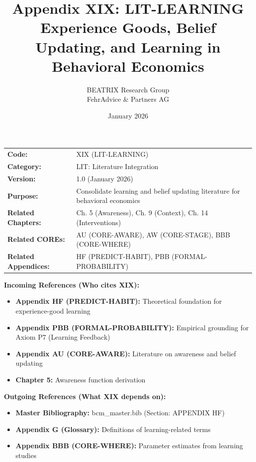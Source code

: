 \documentclass[11pt, a4paper]{article}
\title{Appendix XIX: LIT-LEARNING\\
Experience Goods, Belief Updating, and Learning in Behavioral Economics}
\author{BEATRIX Research Group \\ FehrAdvice \& Partners AG}
\date{January 2026}
\begin{document}
\maketitle


\begin{tcolorbox}[colback=gray!10!white, colframe=gray!75!black, title=Appendix Metadata]
\begin{tabular}{@{}ll@{}}
\textbf{Code:} & XIX (LIT-LEARNING) \\
\textbf{Category:} & LIT: Literature Integration \\
\textbf{Version:} & 1.0 (January 2026) \\
\textbf{Purpose:} & Consolidate learning and belief updating literature for behavioral economics \\
\textbf{Related Chapters:} & Ch. 5 (Awareness), Ch. 9 (Context), Ch. 14 (Interventions) \\
\textbf{Related COREs:} & AU (CORE-AWARE), AW (CORE-STAGE), BBB (CORE-WHERE) \\
\textbf{Related Appendices:} & HF (PREDICT-HABIT), PBB (FORMAL-PROBABILITY) \\
\end{tabular}
\end{tcolorbox}


\begin{tcolorbox}[colback=cyan!5!white, colframe=cyan!75!black, title=Cross-Reference Map]
\textbf{Incoming References (Who cites XIX):}
\begin{itemize}[nosep]
    \item \textbf{Appendix HF (PREDICT-HABIT):} Theoretical foundation for experience-good learning
    \item \textbf{Appendix PBB (FORMAL-PROBABILITY):} Empirical grounding for Axiom P7 (Learning Feedback)
    \item \textbf{Appendix AU (CORE-AWARE):} Literature on awareness and belief updating
    \item \textbf{Chapter 5:} Awareness function derivation
\end{itemize}

\textbf{Outgoing References (What XIX depends on):}
\begin{itemize}[nosep]
    \item \textbf{Master Bibliography:} bcm\_master.bib (Section: APPENDIX HF)
    \item \textbf{Appendix G (Glossary):} Definitions of learning-related terms
    \item \textbf{Appendix BBB (CORE-WHERE):} Parameter estimates from learning studies
\end{itemize}
\end{tcolorbox}
\end{document}

